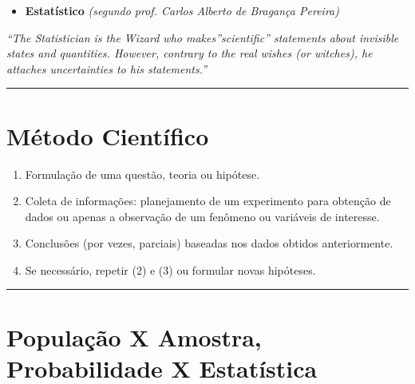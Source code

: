 \documentclass[
]{book}
\providecommand{\tightlist}{%
  \setlength{\itemsep}{0pt}\setlength{\parskip}{0pt}}
\begin{document}
\begin{itemize}
\tightlist
\item
  \textbf{Estatístico} \emph{(segundo prof. Carlos Alberto de Bragança Pereira)}
\end{itemize}

\emph{``The Statistician is the Wizard who makes''scientific'' statements about invisible states and quantities. However, contrary to the real wishes (or witches), he attaches uncertainties to his statements.''}

\begin{center}\rule{0.5\linewidth}{0.5pt}\end{center}

\section{Método Científico}\label{muxe9todo-cientuxedfico}

\begin{enumerate}
\def\labelenumi{\arabic{enumi}.}
\tightlist
\item
  Formulação de uma questão, teoria ou hipótese.\\
\item
  Coleta de informações: planejamento de um experimento para obtenção de dados ou apenas a observação de um fenômeno ou variáveis de interesse.\\
\item
  Conclusões (por vezes, parciais) baseadas nos dados obtidos anteriormente.\\
\item
  Se necessário, repetir (2) e (3) ou formular novas hipóteses.
\end{enumerate}

\begin{center}\rule{0.5\linewidth}{0.5pt}\end{center}

\section{População X Amostra, Probabilidade X Estatística}\label{populauxe7uxe3o-x-amostra-probabilidade-x-estatuxedstica}
\end{document}

